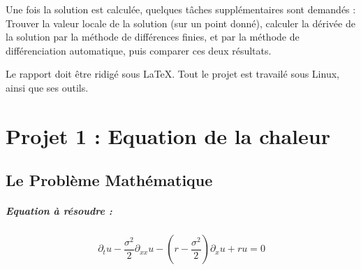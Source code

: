 \documentclass{book}
\begin{document}
Une fois la solution est calculée, quelques tâches supplémentaires sont demandés : Trouver la valeur locale de la solution (sur un point donné), calculer la dérivée de la solution par la méthode de différences finies, et par la méthode de différenciation automatique, puis comparer ces deux résultats.

Le rapport doit être ridigé sous \LaTeX{}. Tout le projet est travailé sous Linux, ainsi que ses outils. 

\chapter{Projet 1 : Equation de la chaleur}
\section{Le Problème Mathématique}
\paragraph{Equation à résoudre :}
\begin{equation}
\label{énoncé}
\partial_{t}u-\frac{\sigma^{2}}{2}\partial_{xx}u-\left(r-\frac{\sigma^{2}}{2}\right)\partial_{x}u+ru=0
\end{equation}
\end{document}
